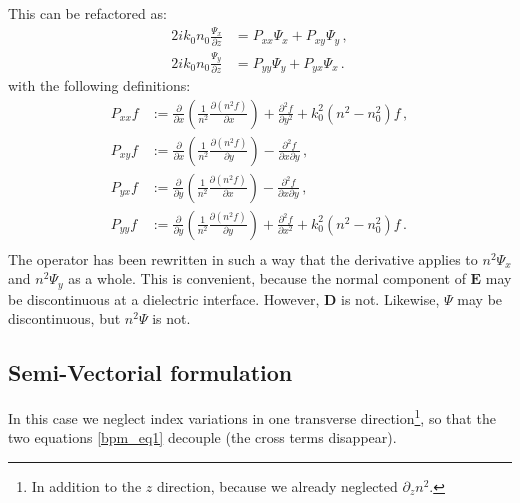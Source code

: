 \documentclass[]{article}
\begin{document}
	This can be refactored as:
	\begin{subequations}
		\begin{align}
			2i k_0 n_0 \frac{\Psi_x}{\partial z} &= P_{xx} \Psi_x+P_{xy} \Psi_y \, ,\\
			2i k_0 n_0 \frac{\Psi_y}{\partial z} &= P_{yy} \Psi_y+P_{yx} \Psi_x \, .
		\end{align}
		\label{bpm_eq1}
	\end{subequations}
	with the following definitions:
	\begin{subequations}
		\begin{align}
			P_{xx} f &:= \frac{\partial}{\partial x}\left(\frac{1}{n^2}\frac{\partial (n^2 f)}{\partial x}  \right)+\frac{\partial^2 f}{\partial y^2}+k_0^2(n^2-n_0^2)f\, , \\
			P_{xy} f &:= \frac{\partial}{\partial x}\left(\frac{1}{n^2}\frac{\partial (n^2 f)}{\partial y}  \right) - \frac{\partial^2 f}{\partial x \partial y}\, ,\\
			P_{yx} f &:= \frac{\partial}{\partial y}\left(\frac{1}{n^2}\frac{\partial (n^2 f)}{\partial x}  \right) - \frac{\partial^2 f}{\partial x \partial y}\, ,\\
			P_{yy} f &:= \frac{\partial}{\partial y}\left(\frac{1}{n^2}\frac{\partial (n^2 f)}{\partial y}  \right)+\frac{\partial^2 f}{\partial x^2}+k_0^2(n^2-n_0^2)f\, .\\
		\end{align}
	\end{subequations}
	The operator has been rewritten in such a way that the derivative applies to $n^2 \Psi_x$ and $n^2 \Psi_y$ as a whole. This is convenient, because the normal component of $\textbf{E}$ may be discontinuous at a dielectric interface. However, $\textbf{D}$ is not. Likewise, $\Psi$ may be discontinuous, but $n^2 \Psi$ is not.
	
	\subsection{Semi-Vectorial formulation}
	In this case we neglect index variations in one transverse direction\footnote{In addition to the $z$ direction, because we already neglected $\partial_z n^2$.}, so that the two equations \eqref{bpm_eq1} decouple (the cross terms disappear). 
		
\end{document}
